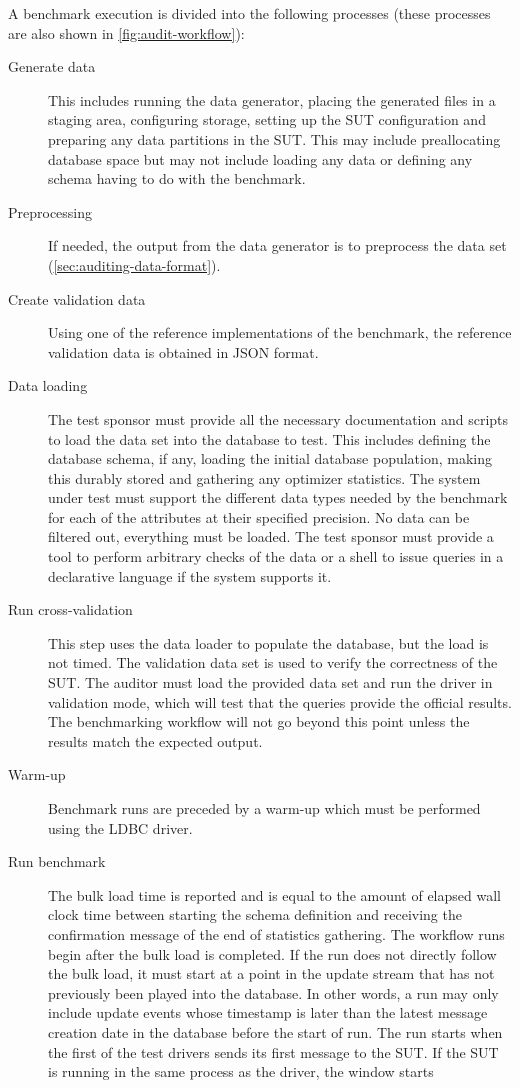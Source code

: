 A benchmark execution is divided into the following processes (these processes are also shown in \autoref{fig:audit-workflow}):

\begin{description}
    \item[Generate data] This includes running the data generator, placing the generated files in a staging area, configuring storage, setting up the SUT configuration and preparing any data partitions in the SUT. This may include preallocating database space but may not include loading any data or defining any schema having to do with the benchmark.
    \item[Preprocessing] If needed, the output from the data generator is to preprocess the data set (\autoref{sec:auditing-data-format}).
    \item[Create validation data] Using one of the reference implementations of the benchmark, the reference validation data is obtained in JSON format.
    \item[Data loading] The test sponsor must provide all the necessary documentation and scripts to load the data set into the database to test.
    This includes defining the database schema, if any, loading the initial database population, making this durably stored and gathering any optimizer statistics.
    The system under test must support the different data types needed by the benchmark for each of the attributes at their specified precision. No data can be filtered out, everything must be loaded. The test sponsor must provide a tool to perform arbitrary checks of the data or a shell to issue queries in a declarative language if the system supports it.
    \item[Run cross-validation] This step uses the data loader to populate the database, but the load is not timed. The validation data set is used to verify the correctness of the SUT. The auditor must load the provided data set and run the driver in validation mode, which will test that the queries provide the official results.  The benchmarking workflow will not go beyond this point unless the results match the expected output.
    \item[Warm-up] Benchmark runs are preceded by a warm-up which must be performed using the LDBC driver.
    \item[Run benchmark] The bulk load time is reported and is equal to the amount of elapsed wall clock time between starting the schema definition and receiving the confirmation message of the end of statistics gathering. The workflow runs begin after the bulk load is completed. If the run does not directly follow the bulk load, it must start at a point in the update stream that has not previously been played into the database. In other words, a run may only include update events whose timestamp is later than the latest message creation date in the database before the start of run. The run starts when the first of the test drivers sends its first message to the SUT. If the SUT is running in the same process as the driver, the window starts

\end{description}
